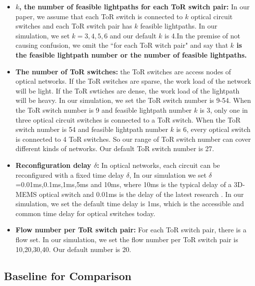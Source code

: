 \begin{itemize}
\item \textbf{$k$, the number of feasible lightpaths for each ToR switch pair:} In our paper, we assume that each ToR switch is connected to $k$ optical circuit switches and each ToR switch pair has $k$ feasible lightpaths. In our simulation, we set $k=3,4,5,6$ and our default $k$ is 4.In the premise of not causing confusion, we omit the ``for each ToR witch pair" and say that \textbf{$k$ is the feasible lightpath number or the number of feasible lightpaths.}
\item \textbf{The number of ToR switches:} the ToR switches are access nodes of optical networks. If the ToR switches are sparse, the work load of the network will be light. If the ToR swtiches are dense, the work load of the lightpath will be heavy. In our simulation, we set the ToR switch number is 9-54. When the ToR switch number is 9 and feasible lightpath number $k$ is 3, only one in three optical circuit switches is connected to a ToR switch. When the ToR switch number is 54 and feasible lightpath number $k$ is 6, every optical switch is connected to 4 ToR switches. So our range of ToR switch number can cover different kinds of networks. Our default ToR switch number is 27.

\item \textbf{Reconfiguration delay $\delta$:} In optical networks, each circuit can be reconfigured with a fixed time delay $\delta$, In our simulation we set $\delta$=0.01ms,0.1ms,1ms,5ms and 10ms, where 10ms is the typical delay of  a 3D-MEMS optical switch \cite{huang2016sunflow} and 0.01ms is the delay of the latest research \cite{porter2013integrating}. In our simulation, we set the default time delay is 1ms, which is the accessible and common time delay for optical switches today.
\item \textbf{Flow number per ToR switch pair:} For each ToR switch pair, there is a flow set. In our simulation, we set the flow number per ToR switch pair is 10,20,30,40. Our default number is 20.
\end{itemize}


\subsection{Baseline for Comparison}

